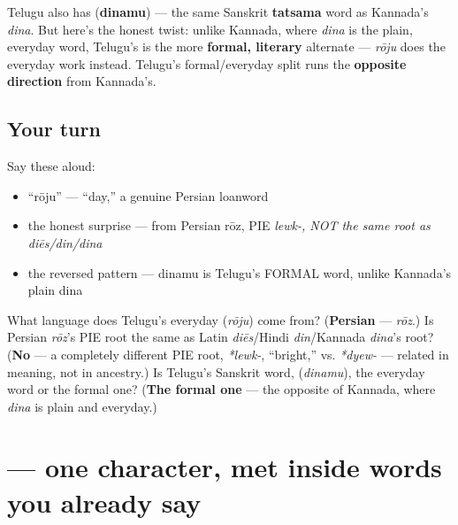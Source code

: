 \begin{culture}
Telugu also has \textbf{} (\textbf{dinamu}) — the same Sanskrit \textbf{tatsama} word as Kannada's \emph{dina}. But here's the honest twist: unlike Kannada, where \emph{dina} is the plain, everyday word, Telugu's \textbf{} is the more \textbf{formal, literary} alternate — \emph{rōju} does the everyday work instead. Telugu's formal/everyday split runs the \textbf{opposite direction} from Kannada's.
\end{culture}

\subsection*{Your turn}
Say these aloud:

\begin{itemize}
\raggedright
  \item \textquotedblleft{}rōju\textquotedblright{} — \textquotedblleft{}day,\textquotedblright{} a genuine Persian loanword
  \item the honest surprise — from Persian rōz, PIE \emph{lewk-, NOT the same root as diēs/din/dina}
  \item the reversed pattern — dinamu is Telugu's FORMAL word, unlike Kannada's plain dina
\end{itemize}

\begin{tcolorbox}[breakable,colback=teal!4,colframe=teal!35!black,title={Before you move on}]
What language does Telugu's everyday \textbf{} (\emph{rōju}) come from? (\textbf{Persian} — \emph{rōz}.) Is Persian \emph{rōz}'s PIE root the same as Latin \emph{diēs}/Hindi \emph{din}/Kannada \emph{dina}'s root? (\textbf{No} — a completely different PIE root, \emph{*lewk-}, \textquotedblleft{}bright,\textquotedblright{} vs. \emph{*dyew-} — related in meaning, not in ancestry.) Is Telugu's Sanskrit word, \emph{} (\emph{dinamu}), the everyday word or the formal one? (\textbf{The formal one} — the opposite of Kannada, where \emph{dina} is plain and everyday.)
\end{tcolorbox}
\section[\texorpdfstring{\te{ణ} (ṇa)}{ణ (ṇa)}]{ — one character, met inside words you already say}

\label{lesson:TE-S126-letter-nna}



